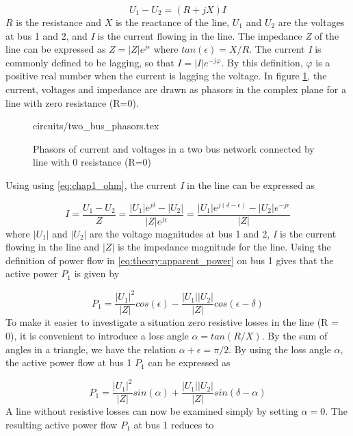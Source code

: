 \documentclass[class=book, crop=false]{standalone}
\begin{document}
\begin{equation}\label{eq:chap1_ohm}
    U_{1} - U_{2} = (R + jX)I
\end{equation}
$R$ is the resistance and $X$ is the reactance of the line, $U_{1}$ and $U_{2}$ are the voltages at bus 1 and 2, and \textit{I} is the current flowing in the line. The impedance \textit{Z} of the line can be expressed as $Z = |Z|e^{j\epsilon}$ where $tan (\epsilon) = X/R$. The current \textit{I} is commonly defined to be lagging, so that $I = |I|e^{-j\varphi}$. By this definition, $\varphi$ is a positive real number when the current is lagging the voltage. In figure \ref{fig:theory:two_bus_phasor}, the current, voltages and impedance are drawn as phasors in the complex plane for a line with zero resistance (R=0).


\begin{figure}[ht!]
    \center
    {circuits/two_bus_phasors.tex}
    \caption[size = 9]{Phasors of current and voltages in a two bus network connected by line with 0 resistance (R=0)}
    \label{fig:theory:two_bus_phasor}
\end{figure}

Using using \eqref{eq:chap1_ohm}, the current \textit{I} in the line can be expressed as

\begin{equation}\label{eq:two_port_current}
    I  = \frac{U_{1} - U_{2}}{Z}
    = \frac{|U_{1}|e^{j\delta} - |U_{2}|}{|Z|e^{j\epsilon}}
    = \frac{|U_{1}|e^{j(\delta- \epsilon)} - |U_{2}|e^{-j\epsilon}}{|Z|}
\end{equation}
where $|U_{1}|$ and $|U_{2}|$ are the voltage magnitudes at bus 1 and 2, \textit{I} is the current flowing in the line and $|Z|$ is the impedance magnitude for the line. Using the definition of power flow in \eqref{eq:theory:apparent_power} on bus 1 gives that the active power $P_{1}$ is given by

\begin{equation}\label{eq:two_port_active_power}
P_{1} = \frac{|U_{1}|^2}{|Z|}cos(\epsilon) - \frac{|U_{1}||U_{2}|}{|Z|}cos(\epsilon - \delta)
\end{equation}
To make it easier to investigate a situation zero resistive losses in the line (R = 0), it is convenient to introduce a loss angle $\alpha = tan(R/X)$. By the sum of angles in a triangle, we have the relation $\alpha + \epsilon = \pi/2$. By using the loss angle $\alpha$, the active power flow at bus 1 $P_{1}$ can be expressed as

\begin{equation}\label{eq:two_port_active_power_good}
P_{1} = \frac{|U_{1}|^2}{|Z|}sin(\alpha) + \frac{|U_{1}||U_{2}|}{|Z|}sin(\delta -\alpha)
\end{equation}
A line without resistive losses can now be examined simply by setting $\alpha = 0$. The resulting active power flow $P_{1}$ at bus 1 reduces to
\end{document}
